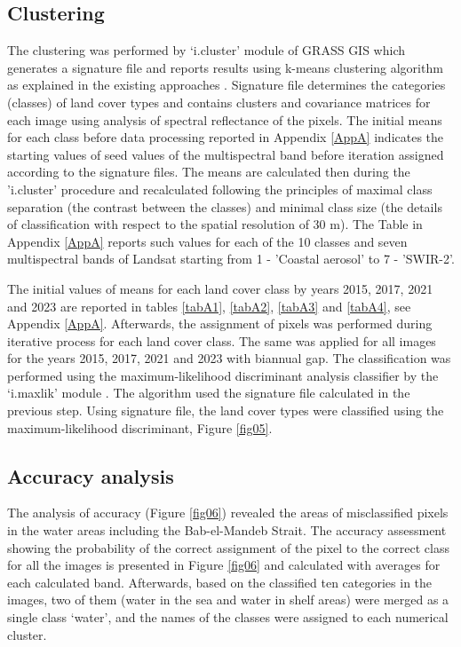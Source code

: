 \documentclass[jimaging,article,submit,pdftex,moreauthors]{Definitions/mdpi}
\begin{document}
\subsection{Clustering}

The clustering was performed by ‘i.cluster’ module of GRASS GIS which generates a signature file and reports results using k-means clustering algorithm as explained in the existing approaches \cite{5930121,10430357,Lemenkova202315,5739741}.{ } Signature file determines the categories (classes) of land cover types{ }and contains{ }clusters and covariance matrices for each image using analysis of spectral reflectance of the pixels. {The initial means for each class before data processing reported in Appendix} \ref{AppA} {indicates the starting values of seed values of the multispectral band before iteration assigned according to the signature files. The means are calculated then during the 'i.cluster' procedure and recalculated following the principles of maximal class separation (the contrast between the classes) and minimal class size (the details of classification with respect to the spatial resolution of 30 m). The Table in Appendix} \ref{AppA} {reports such values for each of the 10 classes and seven multispectral bands of Landsat starting from 1 - 'Coastal aerosol' to 7 - 'SWIR-2'.} 

{The} initial values of means for each land cover class by years 2015, 2017, 2021 and 2023 are reported in tables \ref{tabA1}, \ref{tabA2}, \ref{tabA3} and \ref{tabA4}, see Appendix \ref{AppA}. Afterwards, the assignment of pixels was performed during iterative process for each land cover class. The same was applied for all images for the years 2015, 2017, 2021 and 2023 with biannual gap. The classification was performed using the maximum-likelihood discriminant analysis classifier by the ‘i.maxlik’ module \cite{CHOWDHURY2024100800,Lemenkova202323}. {The algorithm used} the signature file{ }calculated in the previous step. {Using} signature file, the land cover types{ were classified }using the maximum-likelihood discriminant, Figure \ref{fig05}.

\subsection{Accuracy analysis}
 
The analysis of accuracy (Figure \ref{fig06}) revealed the areas of misclassified pixels in the water areas including the Bab-el-Mandeb Strait. The accuracy assessment showing the probability of the correct assignment of the pixel to the correct class for all the images is presented in Figure \ref{fig06} and calculated with averages for each calculated band. Afterwards, based on the classified ten categories in the images, two of them (water in the sea and water in shelf areas) were merged as a single class ‘water’, and the names of the classes were assigned to each numerical cluster. 
\end{document}
